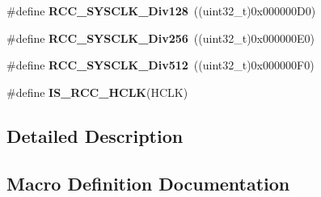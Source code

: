 \begin{DoxyCompactItemize}
\item 
\#define {\bfseries R\+C\+C\+\_\+\+S\+Y\+S\+C\+L\+K\+\_\+\+Div128}~((uint32\+\_\+t)0x000000\+D0)\hypertarget{group___r_c_c___a_h_b___clock___source_ga1a28926fcb86112058a365e01fe9a46b}{}\label{group___r_c_c___a_h_b___clock___source_ga1a28926fcb86112058a365e01fe9a46b}

\item 
\#define {\bfseries R\+C\+C\+\_\+\+S\+Y\+S\+C\+L\+K\+\_\+\+Div256}~((uint32\+\_\+t)0x000000\+E0)\hypertarget{group___r_c_c___a_h_b___clock___source_gaa28bb876893b3267a813fc98a462d5ee}{}\label{group___r_c_c___a_h_b___clock___source_gaa28bb876893b3267a813fc98a462d5ee}

\item 
\#define {\bfseries R\+C\+C\+\_\+\+S\+Y\+S\+C\+L\+K\+\_\+\+Div512}~((uint32\+\_\+t)0x000000\+F0)\hypertarget{group___r_c_c___a_h_b___clock___source_gab5b4588c455d6327bc96f131ed6698ab}{}\label{group___r_c_c___a_h_b___clock___source_gab5b4588c455d6327bc96f131ed6698ab}

\item 
\#define {\bfseries I\+S\+\_\+\+R\+C\+C\+\_\+\+H\+C\+LK}(H\+C\+LK)
\end{DoxyCompactItemize}


\subsection{Detailed Description}


\subsection{Macro Definition Documentation}
